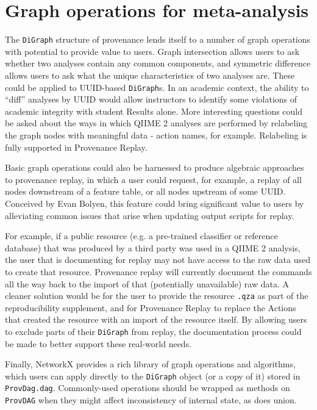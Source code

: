 \section{Graph operations for meta-analysis \parencite[Issue 30]{keefe_issues_2021}}
\label{section:graph_ops}

The \texttt{DiGraph} structure of provenance lends itself to a number of graph operations
with potential to provide value to users. Graph intersection allows users to ask
whether two analyses contain any common components, and symmetric difference
allows users to ask what the unique characteristics of two analyses are. These
could be applied to UUID-based \texttt{DiGraph}s. In an academic context, the ability to
“diff” analyses by UUID would allow instructors to identify some violations of
academic integrity with student Results alone. More interesting questions could
be asked about the ways in which QIIME 2 analyses are performed by relabeling
the graph nodes with meaningful data - action names, for example. Relabeling is
fully supported in Provenance Replay.

Basic graph operations could also be harnessed to produce algebraic approaches
to provenance replay, in which a user could request, for example, a replay of
all nodes downstream of a feature table, or all nodes upstream of some UUID.
Conceived by Evan Bolyen, this feature could bring significant value to users by
alleviating common issues that arise when updating output scripts for
replay.

For example, if a public resource (e.g. a pre-trained classifier or reference
database) that was produced by a third party was used in a QIIME 2 analysis, the
user that is documenting for replay may not have access to the raw data used to
create that resource. Provenance replay will currently document the commands all
the way back to the import of that (potentially unavailable) raw data. A cleaner
solution would be for the user to provide the resource \texttt{.qza} as part of the
reproducibility supplement, and for Provenance Replay to replace the Actions
that created the resource with an import of the resource itself. By allowing
users to exclude parts of their \texttt{DiGraph} from replay, the documentation process
could be made to better support these real-world needs.

Finally, NetworkX provides a rich library of graph operations and algorithms,
which users can apply directly to the \texttt{DiGraph} object (or a copy of it) stored in
\texttt{ProvDag.dag}. Commonly-used operations should be wrapped as methods on
\texttt{ProvDAG} when they might affect inconsistency of internal state, as does union.

